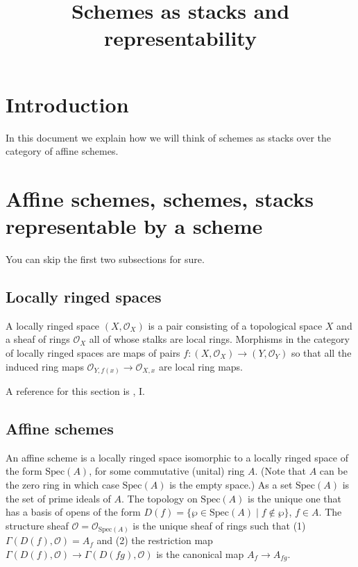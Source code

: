 

%


\title{Schemes as stacks and representability}


\maketitle

\tableofcontents

\section{Introduction}
\label{section-introduction}

\noindent
In this document we explain how we will think of schemes as stacks over the
category of affine schemes.

\section{Affine schemes, schemes, stacks representable by a scheme}
\label{section-schemes}

\noindent
You can skip the first two subsections for sure.

\subsection{Locally ringed spaces}
\label{subsection-locally-ringed-sapces}

\noindent
A locally ringed space $(X,\mathcal{O}_X)$ is a pair consisting of a
topological space $X$ and a sheaf of rings $\mathcal{O}_X$ all of whose stalks
are local rings. Morphisms in the category of locally ringed spaces are
maps of pairs $f : (X, \mathcal{O}_X) \to (Y,\mathcal{O}_Y)$ so that
all the induced ring maps $\mathcal{O}_{Y,f(x)} \to \mathcal{O}_{X,x}$ are
local ring maps.

\smallskip\noindent
A reference for this section is \cite{EGA}, I.

\subsection{Affine schemes}
\label{subsection-affine-schemes}

\noindent
An affine scheme is a locally ringed space isomorphic to a locally ringed
space of the form $\text{Spec}(A)$, for some commutative (unital) ring $A$.
(Note that $A$ can be the zero ring in which case $\text{Spec}(A)$ is
the empty space.) As a set $\text{Spec}(A)$ is the set of prime ideals of
$A$. The topology on $\text{Spec}(A)$ is the unique one that has a basis
of opens of the form $D(f) = \{ \wp \in\text{Spec}(A) \mid
f \not\in \wp \}$,
$f\in A$. The structure sheaf $\mathcal{O} = 
\mathcal{O}_{\text{Spec}(A)}$ is the unique
sheaf of rings such that (1) $\Gamma(D(f), \mathcal{O}) = A_f$ and
(2) the restriction map $\Gamma(D(f), \mathcal{O}) \to \Gamma(D(fg),
\mathcal{O})$ is the canonical map $A_f \to A_{fg}$.

